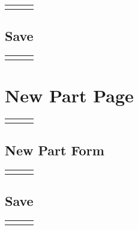 \documentclass[12pt, letterpaper]{article}
\newcommand{\IPO}[3]{
  \begin{center}
    \begin{tabularx}{\linewidth}{XXX}
      \toprule
      \thead{Input} & \thead{Process} & \thead{Output} \\
      \midrule
      \RaggedRight{#1} & \RaggedRight{#2} & \RaggedRight{#3} \\
      \bottomrule
    \end{tabularx}
  \end{center}
}
\newcommand{\n}{\newline}
\begin{document}
\IPO{``Replace image'' button}{Render Filestack file upload}{\textbf{IF} new image file is uploaded\n$\Rightarrow$Filestack CDN URL of the new image\n\textbf{ELSE}\n$\Rightarrow$Current image URL}

\subsection{Save}

\IPO{\begin{itemize}\item Part (\texttt{object})\item New name (\texttt{string})\item New description (\texttt{string})\item New stock (\texttt{int})\item New image URL (\texttt{string})\end{itemize}}{Overwrite the part's fields with the new values\n~\n Update part in database}{Go to part management page}

\section{New Part Page}

\IPO{``New part'' button}{Render admin navigation bar (\ref{adminnavbar})\n Render new part form}{New part page}

\subsection{New Part Form}

\IPO{}{Render part name input\n Render part description input\n Render stock number input (initial value: 0, must be $\geq0$)\n Render Filestack file upload\n Render ``save'' button}{Form}

\subsection{Save}

\IPO{\begin{itemize}\item Name (\texttt{string})\item Description (\texttt{string})\item Stock (\texttt{int})\item Image URL (\texttt{string})\end{itemize}}{Create new part in database}{Go to part management page}
\end{document}
